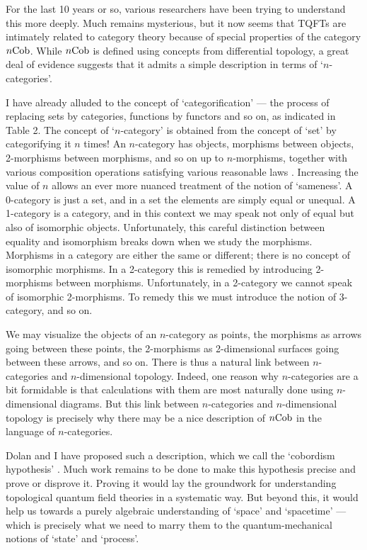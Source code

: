 \documentclass[12pt,amsfonts]{article}
\begin{document}
For the last 10 years or so, various researchers have been trying to
understand this more deeply.  Much remains mysterious, but it now seems
that TQFTs are intimately related to category theory because of special
properties of the category $n{\rm Cob}$.  While $n{\rm Cob}$ is defined using
concepts from differential topology, a great deal of evidence suggests
that it admits a simple description in terms of `$n$-categories'.

I have already alluded to the concept of `categorification' --- the
process of replacing sets by categories, functions by functors and so
on, as indicated in Table 2.   The concept of `$n$-category' is obtained
from the concept of `set' by categorifying it $n$ times!   An
$n$-category has objects, morphisms between objects, 2-morphisms between
morphisms, and so on up to $n$-morphisms, together with various
composition operations satisfying various reasonable laws \cite{B2}.  
Increasing the value of $n$ allows an ever more nuanced treatment of
the notion of `sameness'.  A 0-category is just a set, and in a set 
the elements are simply equal or unequal.  A 1-category is a category, 
and in this context we may speak not only of equal but also of isomorphic 
objects.  Unfortunately, this careful distinction between equality and 
isomorphism breaks down when we study the morphisms.  Morphisms in a 
category are either the same or different; there is no concept of 
isomorphic morphisms.  In a 2-category this is remedied by introducing 
2-morphisms between morphisms.  Unfortunately, in a 2-category we cannot 
speak of isomorphic 2-morphisms.  To remedy this we must introduce the 
notion of 3-category, and so on.

We may visualize the objects of an $n$-category as points, the morphisms
as arrows going between these points, the 2-morphisms as 2-dimensional
surfaces going between these arrows, and so on.  There is thus a natural
link between $n$-categories and $n$-dimensional topology.  Indeed, one
reason why $n$-categories are a bit formidable is that calculations with
them are most naturally done using $n$-dimensional diagrams.   But this
link between $n$-categories and $n$-dimensional topology is precisely
why there may be a nice description of $n{\rm Cob}$ in the language of
$n$-categories.   

Dolan and I have proposed such a description, which we call the
`cobordism hypothesis' \cite{BD}.  Much work remains to be done to
make this hypothesis precise and prove or disprove it.  Proving it would
lay the groundwork for understanding topological quantum field theories
in a systematic way.  But beyond this, it would help us towards a
purely algebraic understanding of `space' and `spacetime' --- which is
precisely what we need to marry them to the quantum-mechanical notions of
`state' and `process'.  
\end{document}
